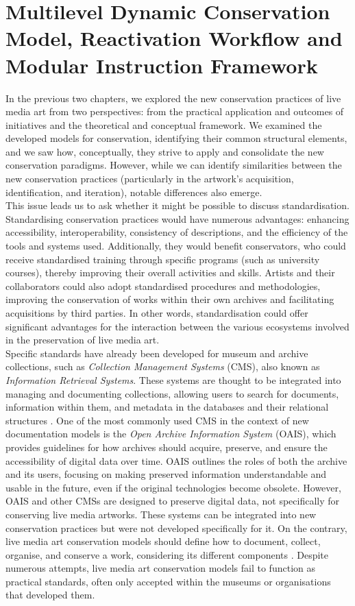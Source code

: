 \chapter{\label{ch:3-mdc_model-reactivation_workflow-instruction_template}Multilevel Dynamic Conservation Model, Reactivation Workflow and Modular Instruction Framework}
In the previous two chapters, we explored the new conservation practices of live media art from two perspectives: from the practical application and outcomes of initiatives and the theoretical and conceptual framework. We examined the developed models for conservation, identifying their common structural elements, and we saw how, conceptually, they strive to apply and consolidate the new conservation paradigms. However, while we can identify similarities between the new conservation practices (particularly in the artwork's acquisition, identification, and iteration), notable differences also emerge.\\
This issue leads us to ask whether it might be possible to discuss standardisation. Standardising conservation practices would have numerous advantages: enhancing accessibility, interoperability, consistency of descriptions, and the efficiency of the tools and systems used. Additionally, they would benefit conservators, who could receive standardised training through specific programs (such as university courses), thereby improving their overall activities and skills. Artists and their collaborators could also adopt standardised procedures and methodologies, improving the conservation of works within their own archives and facilitating acquisitions by third parties. In other words, standardisation could offer significant advantages for the interaction between the various ecosystems involved in the preservation of live media art.\\
Specific standards have already been developed for museum and archive collections, such as \textit{Collection Management Systems} (CMS), also known as \textit{Information Retrieval Systems}. These systems are thought to be integrated into managing and documenting collections, allowing users to search for documents, information within them, and metadata in the databases and their relational structures \cite{dekker2018collecting}. One of the most commonly used CMS in the context of new documentation models is the \textit{Open Archive Information System} (OAIS), which provides guidelines for how archives should acquire, preserve, and ensure the accessibility of digital data over time. OAIS outlines the roles of both the archive and its users, focusing on making preserved information understandable and usable in the future, even if the original technologies become obsolete. However, OAIS and other CMSs are designed to preserve digital data, not specifically for conserving live media artworks. These systems can be integrated into new conservation practices but were not developed specifically for it. On the contrary, live media art conservation models should define how to document, collect, organise, and conserve a work, considering its different components \cite{dekker2018collecting}. Despite numerous attempts, live media art conservation models fail to function as practical standards, often only accepted within the museums or organisations that developed them.\\
